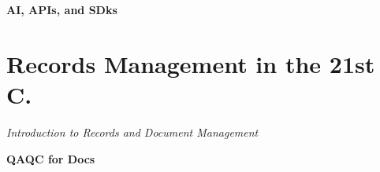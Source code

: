 \documentclass[12pt, letterpaper]{article}
\begin{document}
\begin{outline}[enumerate]
\1 \textbf{AI, APIs, and SDks}

\end{outline}


\section{Records Management in the 21st C.}
\large
\begin{flushleft}
\textit{Introduction to Records and Document Management}
\end{flushleft}
\normalsize

\begin{outline}[enumerate]
\1 \textbf{QAQC for Docs}

\end{outline}



\section{}
\large
\begin{flushleft}
\textit{}
\end{flushleft}
\normalsize

\begin{outline}[enumerate]
\1 \textbf{}

\end{outline}





\clearpage 
\renewcommand{\thepage}{}
\printbibliography
\end{document}
